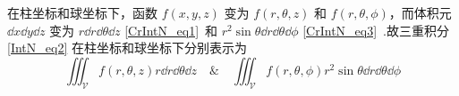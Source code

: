 在柱坐标和球坐标下，函数 $f(x,y,z)$ 变为 $f(r,\theta,z)$ 和 $f(r,\theta,\phi)$，而体积元 $\dd x\dd y\dd z$ 变为 $r\dd r\dd\theta\dd z$ \autoref{CrIntN_eq1}~和 $r^2\sin\theta\dd r\dd\theta\dd\phi$ \autoref{CrIntN_eq3}~.故三重积分\autoref{IntN_eq2} 在柱坐标和球坐标下分别表示为
\begin{equation}
\iiint_{\mathcal{V}}f(r,\theta,z)r\dd r\dd\theta\dd z\quad \&\quad
\iiint_{\mathcal{V}}f(r,\theta,\phi)r^2\sin\theta\dd r\dd\theta\dd\phi
\end{equation}

